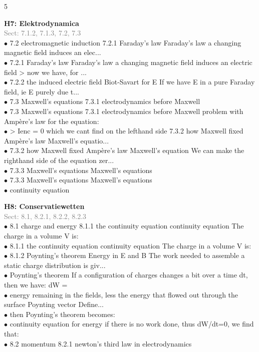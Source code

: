 \documentclass[7pt,a4paper]{article}
\begin{document}
\begin{multicols*}{5}


\textbf{H7: Elektrodynamica}\\\textcolor{gray}{{Sect: 7.1.2, 7.1.3, 7.2, 7.3}}\\\vspace{0.5pt}
$\bullet$ 7.2 electromagnetic induction 
7.2.1 Faraday's law 
Faraday's law a changing magnetic field induces an elec...\\
$\bullet$ 7.2.1 Faraday's law 
Faraday's law a changing magnetic field induces an electric field 
> now we have, for ...\\
$\bullet$ 7.2.2 the induced electric field 
Biot-Savart for E If we have E in a pure Faraday field, ie E purely due t...\\
$\bullet$ 7.3 Maxwell's equations 
7.3.1 electrodynamics before Maxwell\\
$\bullet$ 7.3 Maxwell's equations 
7.3.1 electrodynamics before Maxwell 
problem with Ampère's law for the equation:\\
$\bullet$ > Ienc = 0 which we cant find on the lefthand side 
7.3.2 how Maxwell fixed Ampère's law 
Maxwell's equatio...\\
$\bullet$ 7.3.2 how Maxwell fixed Ampère's law 
Maxwell's equation We can make the righthand side of the equation zer...\\
$\bullet$ 7.3.3 Maxwell's equations 
Maxwell's equations\\
$\bullet$ 7.3.3 Maxwell's equations 
Maxwell's equations\\
$\bullet$ continuity equation\\
\columnbreak

\textbf{H8: Conservatiewetten}\\\textcolor{gray}{{Sect: 8.1, 8.2.1, 8.2.2, 8.2.3}}\\\vspace{0.5pt}
$\bullet$ 8.1 charge and energy 
8.1.1 the continuity equation 
continuity equation The charge in a volume V is:\\
$\bullet$ 8.1.1 the continuity equation 
continuity equation The charge in a volume V is:\\
$\bullet$ 8.1.2 Poynting's theorem 
Energy in E and B The work needed to assemble a static charge distribution is giv...\\
$\bullet$ Poynting's theorem If a configuration of charges changes a bit over a time dt, then we have: 
  dW =\\
$\bullet$ energy remaining in the fields, less the energy that flowed out through the surface 
Poynting vector Define...\\
$\bullet$ then Poynting's theorem becomes:\\
$\bullet$ continuity equation for energy if there is no work done, thus dW/dt=0, we find that:\\
$\bullet$ 8.2 momentum 
8.2.1 newton's third law in electrodynamics\\
\columnbreak


\end{multicols*}
\end{document}
